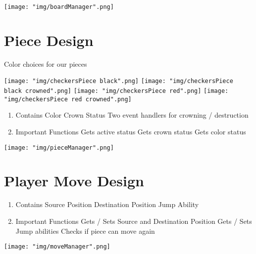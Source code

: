 \documentclass{scrreprt}
\begin{document}
	\texttt{[image: "img/boardManager".png]}
	

	\section{Piece Design}
		Color choices for our pieces
	
		\texttt{[image: "img/checkersPiece black".png]}
		\texttt{[image: "img/checkersPiece black crowned".png]}
		\texttt{[image: "img/checkersPiece red".png]}
		\texttt{[image: "img/checkersPiece red crowned".png]}
	
		\begin{enumerate} [label*=\arabic*.]
		\item Contains
			\subitem Color
			\subitem Crown Status
			\subitem Two event handlers for crowning / destruction
		\item Important Functions
			\subitem Gets active status
			\subitem Gets crown status
			\subitem Gets color status
		\end{enumerate}
	
		\texttt{[image: "img/pieceManager".png]}

	\section{Player Move Design}
		\begin{enumerate}[label*=\arabic*.]
		\item Contains
			\subitem Source Position
			\subitem Destination Position
			\subitem Jump Ability
		\item Important Functions
			\subitem Gets / Sets Source and Destination Position
			\subitem Gets / Sets Jump abilities
			\subitem Checks if piece can move again		
		\end{enumerate}

		\texttt{[image: "img/moveManager".png]}
\end{document}
